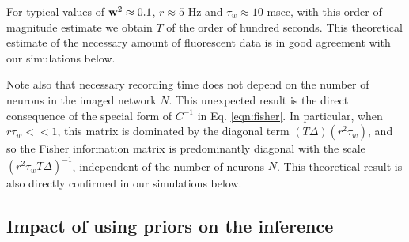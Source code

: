 For typical values of $\mathbf{w}^2\approx 0.1$, $r\approx 5$  Hz and $ \tau_w \approx 10$ msec, 
with this order of magnitude estimate we obtain $T$ of the order of hundred seconds. This theoretical estimate of the necessary amount of fluorescent data is in good agreement with our simulations below.

Note also that necessary recording time does not depend on the number of neurons in the imaged network $N$. This unexpected result is the direct consequence of the special form of $C^{-1}$ in Eq. \ref{eqn:fisher}. In particular, when $r \tau_w <<1$, this matrix is dominated by the diagonal term $(T\Delta)(r^2  \tau_w)$, and so the Fisher information matrix is predominantly diagonal with the scale $(r^2 \tau_w T\Delta)^{-1}$, independent of the number of neurons $N$. This theoretical result is also directly confirmed in our simulations below.

\subsection{Impact of using priors on the inference}

